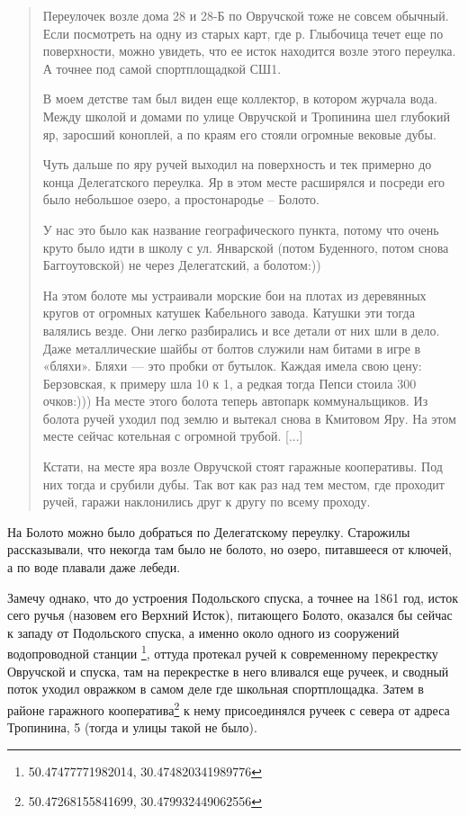 \begin{quotation}
Переулочек возле дома 28 и 28-Б по Овручской тоже не совсем обычный. Если посмотреть на одну из старых карт, где р. Глыбочица течет еще по поверхности, можно увидеть, что ее исток находится возле этого переулка. А точнее под самой спортплощадкой СШ1. 

В моем детстве там был виден еще коллектор, в котором журчала вода. Между школой и домами по улице Овручской и Тропинина шел глубокий яр, заросший коноплей, а по краям его стояли огромные вековые дубы. 

Чуть дальше по яру ручей выходил на поверхность и тек примерно до конца Делегатского переулка. Яр в этом месте расширялся и посреди его было небольшое озеро, а простонародье – Болото. 

У нас это было как название географического пункта, потому что оч\-ень круто было идти в школу с ул. Январской (потом Буденного, потом снова Баггоутовской) не через Делегатский, а болотом:))

На этом болоте мы устраивали морские бои на плотах из деревянных кругов от огромных катушек Кабельного завода. Катушки эти тогда валялись везде. Они легко разбирались и все детали от них шли в дело. Даже металлические шайбы от болтов служили нам битами в игре в «бляхи». Бляхи — это пробки от бутылок. Каждая имела свою цену: Берзовская, к примеру шла 10 к 1, а редкая тогда Пепси стоила 300 очков:))) На месте этого болота теперь автопарк коммунальщиков. Из болота ручей уходил под землю и вытекал снова в Кмитовом Яру. На этом месте сейчас котельная с огромной трубой. [...]

Кстати, на месте яра возле Овручской стоят гаражные кооперативы. Под них тогда и срубили дубы. Так вот как раз над тем местом, где проходит ручей, гаражи наклонились друг к другу по всему проходу.﻿
\end{quotation} 

На Болото можно было добраться по Делегатскому переулку. Старожилы рассказывали, что некогда там было не болото, но озеро, питавшееся от ключей, а по воде плавали даже лебеди.

Замечу однако, что до устроения Подольского спуска, а точнее на 1861 год, исток сего ручья (назовем его Верхний Исток), питающего Болото, оказался бы сейчас к западу от Подольского спуска, а именно около одного из сооружений водопроводной станции \footnote{50.47477771982014, 30.474820341989776}, оттуда протекал ручей к современному перекрестку Овручской и спуска, там на перекрестке в него вливался еще ручеек, и сводный поток уходил овражком в самом деле где школьная спортплощадка. Затем в районе гаражного кооператива\footnote{50.47268155841699, 30.479932449062556} к нему присоединялся ручеек с севера от адреса Тропинина, 5 (тогда и улицы такой не было).

